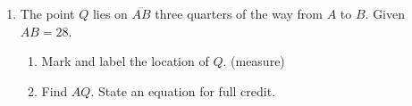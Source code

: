 \begin{enumerate}
\item The point $Q$ lies on $\overline{AB}$ three quarters of the way from $A$ to $B$. Given $AB=28$.
  \begin{enumerate}
    \item Mark and label the location of $Q$. (measure)
    \item Find ${AQ}$. State an equation for full credit.
  \end{enumerate} \vspace{1cm} 
  \begin{center}
  \end{center}


\end{enumerate}
